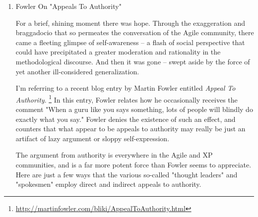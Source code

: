 \documentclass{article}
\begin{document}
\begin{enumerate}
\item Fowler On "Appeals To Authority"
\label{sec:orgheadline220}

For a brief, shining moment there was hope. Through the exaggeration and
braggadocio that so permeates the conversation of the Agile community,
there came a fleeting glimpse of self-awareness -- a flash of social
perspective that could have precipitated a greater moderation and
rationality in the methodological discourse. And then it was gone --
swept aside by the force of yet another ill-considered generalization.

I'm referring to a recent blog entry by Martin Fowler entitled \emph{Appeal
To Authority}. \footnote{\url{http://martinfowler.com/bliki/AppealToAuthority.html}} In this entry, Fowler relates how he occasionally
receives the comment "When a guru like you says something, lots of
people will blindly do exactly what you say." Fowler denies the
existence of such an effect, and counters that what appear to be appeals
to authority may really be just an artifact of lazy argument or sloppy
self-expression.

The argument from authority is everywhere in the Agile and XP
communities, and is a far more potent force than Fowler seems to
appreciate. Here are just a few ways that the various so-called "thought
leaders" and "spokesmen" employ direct and indirect appeals to
authority.


\end{enumerate}
\end{document}
